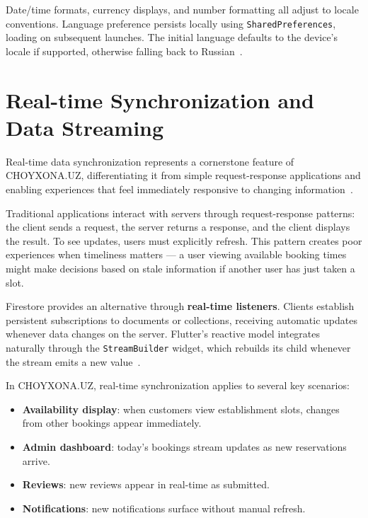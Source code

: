 Date/time formats, currency displays, and number formatting all adjust to locale conventions.
Language preference persists locally using \texttt{SharedPreferences}, loading on subsequent launches.
The initial language defaults to the device's locale if supported, otherwise falling back to Russian~\cite{sommerville2015}.


\section{Real-time Synchronization and Data Streaming}
\label{sec:realtime}

Real-time data synchronization represents a cornerstone feature of CHOYXONA.UZ, differentiating it from simple request-response applications and enabling experiences that feel immediately responsive to changing information~\cite{firebase_firestore2024}.

Traditional applications interact with servers through request-response patterns: the client sends a request, the server returns a response, and the client displays the result.
To see updates, users must explicitly refresh.
This pattern creates poor experiences when timeliness matters --- a user viewing available booking times might make decisions based on stale information if another user has just taken a slot.

Firestore provides an alternative through \textbf{real-time listeners}.
Clients establish persistent subscriptions to documents or collections, receiving automatic updates whenever data changes on the server.
Flutter's reactive model integrates naturally through the \texttt{StreamBuilder} widget, which rebuilds its child whenever the stream emits a new value~\cite{flutter_arch2024}.

In CHOYXONA.UZ, real-time synchronization applies to several key scenarios:
\begin{itemize}
  \item \textbf{Availability display}: when customers view establishment slots, changes from other bookings appear immediately.
  \item \textbf{Admin dashboard}: today's bookings stream updates as new reservations arrive.
  \item \textbf{Reviews}: new reviews appear in real-time as submitted.
  \item \textbf{Notifications}: new notifications surface without manual refresh.
\end{itemize}

